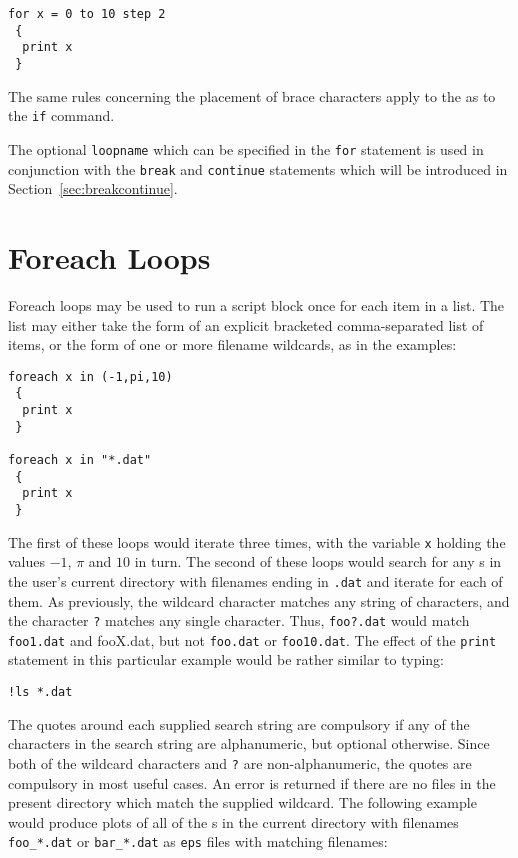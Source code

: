 \begin{verbatim}
for x = 0 to 10 step 2
 {
  print x
 }
\end{verbatim}

\noindent The same rules concerning the placement of brace characters apply to
the  as to the {\tt if} command.

The optional {\tt loopname} which can be specified in the {\tt for} statement
is used in conjunction with the {\tt break} and {\tt continue} statements which
will be introduced in Section~\ref{sec:breakcontinue}.

\section{Foreach Loops}

Foreach loops may be used to run a script block once for each item in a list.
The list may either take the form of an explicit bracketed comma-separated list
of items, or the form of one or more filename wildcards, as in the examples:

\begin{verbatim}
foreach x in (-1,pi,10)
 {
  print x
 }

foreach x in "*.dat"
 {
  print x
 }
\end{verbatim}

The first of these loops would iterate three times, with the variable {\tt x}
holding the values $-1$, $\pi$ and $10$ in turn. The second of these loops
would search for any \datafile s in the user's current directory with filenames
ending in {\tt .dat} and iterate for each of them. As previously, the wildcard
character {\tt *} matches any string of characters, and the character {\tt ?}
matches any single character. Thus, {\tt foo?.dat} would match {\tt foo1.dat}
and {fooX.dat}, but not {\tt foo.dat} or {\tt foo10.dat}. The effect of the
{\tt print} statement in this particular example would be rather similar to
typing:

\begin{verbatim}
!ls *.dat
\end{verbatim}

The quotes around each supplied search string are compulsory if any of the
characters in the search string are alphanumeric, but optional otherwise. Since
both of the wildcard characters {\tt *} and {\tt ?} are non-alphanumeric, the
quotes are compulsory in most useful cases.  An error is returned if there are
no files in the present directory which match the supplied wildcard. The
following example would produce plots of all of the \datafile s in the current
directory with filenames {\tt foo\_*.dat} or {\tt bar\_*.dat} as {\tt eps}
files with matching filenames:

